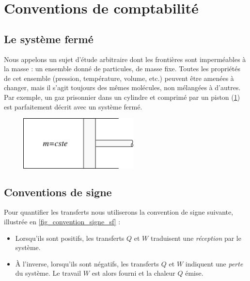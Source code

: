 \section{Conventions de comptabilité}

	\subsection{Le système fermé}

			Nous appelons  un sujet d’étude arbitraire dont les frontières sont imperméables à la masse : un ensemble donné de particules, de masse fixe. Toutes les propriétés de cet ensemble (pression, température, volume, etc.) peuvent être amenées à changer, mais il s’agit toujours des mêmes molécules, non mélangées à d’autres. Par exemple, un gaz prisonnier dans un cylindre et comprimé par un piston (\cref{fig_piston_m_cste}) est parfaitement décrit avec un système fermé.

		\begin{figure}
			\begin{center}
			\includegraphics[width=6cm]{images/piston_cylindre.png}
			\end{center}
			\label{fig_piston_m_cste}
		\end{figure}

	\subsection{Conventions de signe} 
	\label{ch_convention_signe_sf}

		Pour quantifier les transferts nous utiliserons la convention de signe suivante, illustrée en \cref{fig_convention_signe_sf} :

		\begin{itemize}
			\item Lorsqu’ils sont positifs, les transferts $Q$ et $W$ traduisent une \emph{réception} par le système.
			\item À l’inverse, lorsqu’ils sont négatifs, les transferts $Q$ et $W$ indiquent une \emph{perte} du système. Le travail $W$ est alors fourni et la chaleur $Q$ émise.
		\end{itemize}

